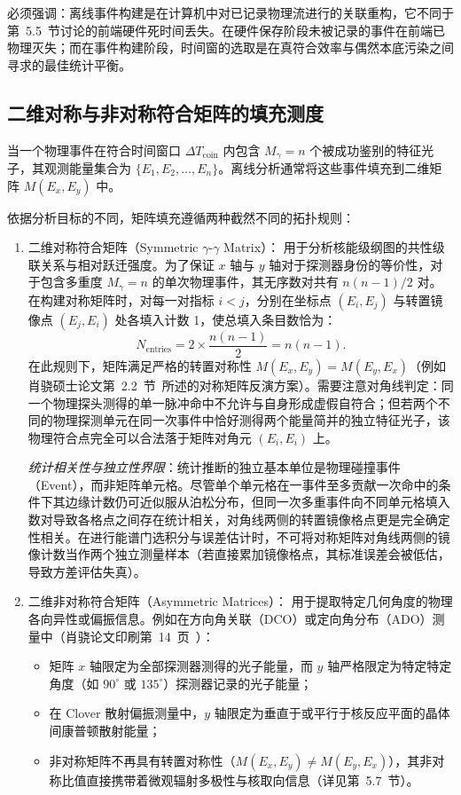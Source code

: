 必须强调：离线事件构建是在计算机中对已记录物理流进行的关联重构，它不同于第~5.5~节讨论的前端硬件死时间丢失。在硬件保存阶段未被记录的事件在前端已物理灭失；而在事件构建阶段，时间窗的选取是在真符合效率与偶然本底污染之间寻求的最佳统计平衡。

\subsection{二维对称与非对称符合矩阵的填充测度}\label{subsec:5-6-2}

当一个物理事件在符合时间窗口 $\Delta T_{\mathrm{coin}}$ 内包含 $M_\gamma = n$ 个被成功鉴别的特征光子，其观测能量集合为 $\{E_1, E_2, \dots, E_n\}$。离线分析通常将这些事件填充到二维矩阵 $M(E_x, E_y)$ 中。

依据分析目标的不同，矩阵填充遵循两种截然不同的拓扑规则：
\begin{enumerate}
\item 二维对称符合矩阵（Symmetric $\gamma\text{-}\gamma$ Matrix）：
用于分析核能级纲图的共性级联关系与相对跃迁强度。为了保证 $x$ 轴与 $y$ 轴对于探测器身份的等价性，对于包含多重度 $M_\gamma = n$ 的单次物理事件，其无序数对共有 $n(n - 1)/2$ 对。在构建对称矩阵时，对每一对指标 $i < j$，分别在坐标点 $(E_i, E_j)$ 与转置镜像点 $(E_j, E_i)$ 处各填入计数 1，使总填入条目数恰为：
\begin{equation}\label{eq:5-6-ordered-pairs}
N_{\mathrm{entries}} = 2 \times \frac{n(n - 1)}{2} = n (n - 1).
\end{equation}
在此规则下，矩阵满足严格的转置对称性 $M(E_x, E_y) = M(E_y, E_x)$（例如肖骁硕士论文第~2.2~节~\cite[印刷第~14~页，PDF 第~24~页]{xiao-xiao-2019-high-spin-74as-thesis}所述的对称矩阵反演方案）。需要注意对角线判定：同一个物理探头测得的单一脉冲命中不允许与自身形成虚假自符合；但若两个不同的物理探测单元在同一次事件中恰好测得两个能量简并的独立特征光子，该物理符合点完全可以合法落于矩阵对角元 $(E_i, E_i)$ 上。

\emph{统计相关性与独立性界限}：统计推断的独立基本单位是物理碰撞事件（Event），而非矩阵单元格。尽管单个单元格在一事件至多贡献一次命中的条件下其边缘计数仍可近似服从泊松分布，但同一次多重事件向不同单元格填入数对导致各格点之间存在统计相关，对角线两侧的转置镜像格点更是完全确定性相关。在进行能谱门选积分与误差估计时，不可将对称矩阵对角线两侧的镜像计数当作两个独立测量样本（若直接累加镜像格点，其标准误差会被低估，导致方差评估失真）。
\item 二维非对称符合矩阵（Asymmetric Matrices）：
用于提取特定几何角度的物理各向异性或偏振信息。例如在方向角关联（DCO）或定向角分布（ADO）测量中（肖骁论文印刷第~14~页~\cite{xiao-xiao-2019-high-spin-74as-thesis}）：
\begin{itemize}
\item 矩阵 $x$ 轴限定为全部探测器测得的光子能量，而 $y$ 轴严格限定为特定特定角度（如 $90^\circ$ 或 $135^\circ$）探测器记录的光子能量；
\item 在 Clover 散射偏振测量中，$y$ 轴限定为垂直于或平行于核反应平面的晶体间康普顿散射能量；
\item 非对称矩阵不再具有转置对称性（$M(E_x, E_y) \ne M(E_y, E_x)$），其非对称比值直接携带着微观辐射多极性与核取向信息（详见第~5.7~节）。
\end{itemize}
\end{enumerate}

